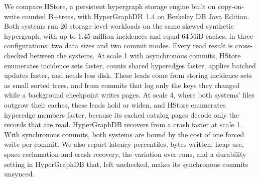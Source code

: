 We compare HStore, a persistent hypergraph storage engine built on copy-on-write counted B+trees, with HyperGraphDB~1.4 on Berkeley DB Java Edition. Both systems run 26 storage-level workloads on the same skewed synthetic hypergraph, with up to 1.45 million incidences and equal 64\,MiB caches, in three configurations: two data sizes and two commit modes. Every read result is cross-checked between the systems. At scale 1 with asynchronous commits, HStore enumerates incidence sets  faster, counts shared hyperedges  faster, applies batched updates  faster, and needs  less disk. These leads come from storing incidence sets as small sorted trees, and from commits that log only the keys they changed while a background checkpoint writes pages. At scale 4, where both systems' files outgrow their caches, these leads hold or widen, and HStore enumerates hyperedge members  faster, because its cached catalog pages decode only the records that are read. HyperGraphDB recovers from a crash faster at scale 1. With synchronous commits, both systems are bound by the cost of one forced write per commit. We also report latency percentiles, bytes written, heap use, space reclamation and crash recovery, the variation over runs, and a durability setting in HyperGraphDB that, left unchecked, makes its synchronous commits unsynced.
